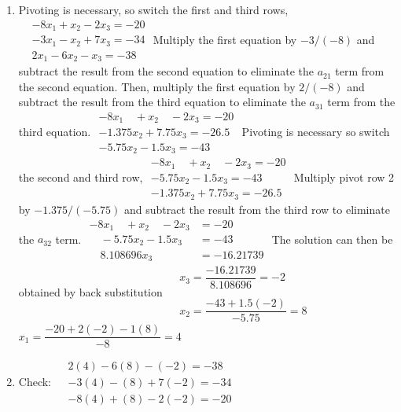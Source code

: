 \documentclass[../main.tex]{subfiles}
\begin{document}
\section{}
\begin{enumerate}[label=\bfseries(\alph*)]
\item Pivoting is necessary, so switch the first and third rows,
\bigbreak$
\begin{aligned}
&-8 x_{1}+x_{2}-2 x_{3}=-20 \\
&-3 x_{1}-x_{2}+7 x_{3}=-34 \\
&2 x_{1}-6 x_{2}-x_{3}=-38
\end{aligned}$
\bigbreak
Multiply the first equation by $-3 /(-8)$ and subtract the result from the second equation to eliminate the $a_{21}$ term from the second equation. Then, multiply the first equation by $2 /(-8)$ and subtract the result from the third equation to eliminate the $a_{31}$ term from the third equation.
\bigbreak$
\begin{gathered}
-8 x_{1} \quad+x_{2} \quad-2 x_{3}=-20 \\
-1.375 x_{2}+7.75 x_{3}=-26.5 \\
-5.75 x_{2}-1.5 x_{3}=-43
\end{gathered}$
\bigbreak
Pivoting is necessary so switch the second and third row,
\bigbreak$
\begin{gathered}
-8 x_{1} \quad+x_{2} \quad-2 x_{3}=-20 \\
-5.75 x_{2}-1.5 x_{3} =-43 \\
-1.375 x_{2}+7.75 x_{3} =-26.5
\end{gathered}$
\bigbreak
Multiply pivot row 2 by $-1.375 /(-5.75)$ and subtract the result from the third row to eliminate the $a_{32}$ term.
\bigbreak$
\begin{aligned}
-8 x_{1}\quad+x_{2} \quad -2 x_{3}  &=-20 \\
\quad-5.75 x_{2}  -1.5 x_{3}  &=-43 \\
\quad8.108696 x_{3}  &=-16.21739
\end{aligned}$
\bigbreak
The solution can then be obtained by back substitution
\bigbreak$
\begin{aligned}
&x_{3}=\dfrac{-16.21739}{8.108696}=-2 \\\\
&x_{2}=\dfrac{-43+1.5(-2)}{-5.75}=8
\end{aligned}$
\bigbreak
$x_{1}=\dfrac{-20+2(-2)-1(8)}{-8}=4$
\bigbreak
\item Check:
\bigbreak$
\begin{aligned}
&2(4)-6(8)-(-2)=-38 \\
&-3(4)-(8)+7(-2)=-34 \\
&-8(4)+(8)-2(-2)=-20
\end{aligned}$
\bigbreak



\end{enumerate}
\end{document}
